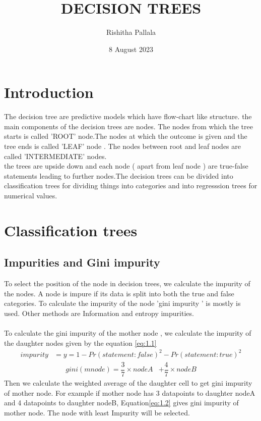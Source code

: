\documentclass{article}
\title{DECISION TREES}
\author{Rishitha Pallala }
\date{8 August 2023}
\begin{document}
\maketitle
\section{Introduction}
The decision tree are predictive models which have flow-chart like structure. the main components of the decision trees are nodes. The nodes from which the tree starts is called 'ROOT' node.The nodes at which the outcome is given and the tree ends is called 'LEAF' node . The nodes between root and leaf nodes are called 'INTERMEDIATE' nodes.\\the trees are upside down and each node ( apart from leaf node ) are true-false statements leading to further nodes.The decision trees can be divided into classification trees for dividing things into categories and into regresssion trees for numerical values.
\section{Classification trees}
\subsection{Impurities and Gini impurity}
 To select the position of the node in decision trees, we calculate the impurity of the  nodes. A node is impure if its data is split into both the true and false categories. To calculate the impurity of the node 'gini impurity ' is mostly is used. Other methods are Information and entropy impurities.\\\\
 To calculate the gini impurity of the mother node , we calculate the impurity of the daughter nodes given by the equation \eqref{eq:1.1}
 \begin{align}
     impurity&=y=1-{Pr(statement:false)^2}-{Pr(statement:true)^2}\label{eq:1.1}
     \end{align}
     \begin{align}
     gini ( m node)=\dfrac{3}{7}\times{ nodeA}&+\dfrac{4}{7}\times{node B}\label{eq:1.2}
  \end{align}
   Then we calculate the weighted average of the daughter cell to get gini impurity
of mother node. For example if mother node has 3 datapoints to daughter
nodeA and 4 datapoints to daughter nodeB, Equation\eqref{eq:1.2} gives gini impurity
of mother node. The node with least Impurity will be selected.
\end{document}
